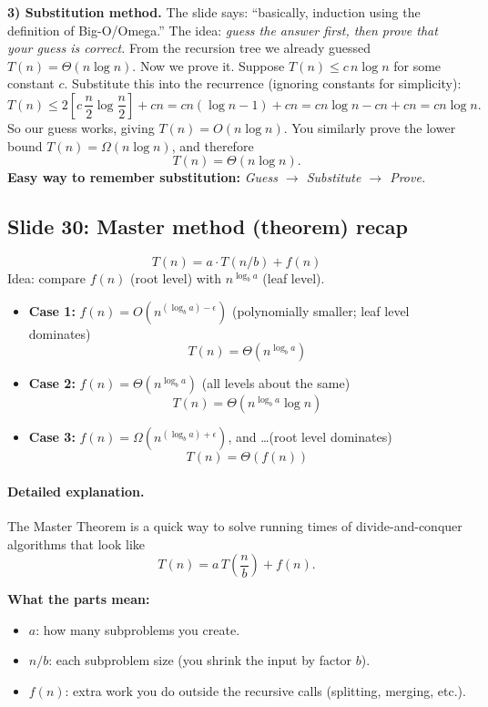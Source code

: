 \documentclass[11pt]{article}
\newcommand{\slide}[2]{\subsection*{Slide #1: #2}}
\begin{document}
\textbf{3) Substitution method.}
The slide says: ``basically, induction using the definition of Big-O/Omega.'' The idea:
\emph{guess the answer first, then prove that your guess is correct.}
From the recursion tree we already guessed $T(n) = \Theta(n \log n)$. Now we prove it.
Suppose $T(n) \le c\, n \log n$ for some constant $c$. Substitute this into the recurrence
(ignoring constants for simplicity):
\[
  T(n) \le 2\left[ c\,\frac{n}{2} \log\frac{n}{2} \right] + cn
        = cn(\log n - 1) + cn
        = cn\log n - cn + cn
        = cn\log n.
\]
So our guess works, giving $T(n) = O(n \log n)$. You similarly prove the lower bound
$T(n) = \Omega(n \log n)$, and therefore
\[
  \boxed{T(n) = \Theta(n \log n)}.
\]
\textbf{Easy way to remember substitution:} \emph{Guess $\to$ Substitute $\to$ Prove.}

\slide{30}{Master method (theorem) recap}
\[
  T(n) = a \cdot T(n/b) + f(n)
\]
Idea: compare $f(n)$ (root level) with $n^{\log_b a}$ (leaf level).
\begin{itemize}
  \item \textbf{Case 1:} $f(n) = O(n^{(\log_b a) - \epsilon})$ \hfill (polynomially smaller; leaf level dominates)
        \[ T(n) = \Theta(n^{\log_b a}) \]
  \item \textbf{Case 2:} $f(n) = \Theta(n^{\log_b a})$ \hfill (all levels about the same)
        \[ T(n) = \Theta(n^{\log_b a} \log n) \]
  \item \textbf{Case 3:} $f(n) = \Omega(n^{(\log_b a) + \epsilon})$, and \ldots \hfill (root level dominates)
        \[ T(n) = \Theta(f(n)) \]
\end{itemize}

\paragraph{Detailed explanation.}
The Master Theorem is a quick way to solve running times of divide-and-conquer algorithms that
look like
\[
  T(n) = a\,T\!\left(\frac{n}{b}\right) + f(n).
\]

\textbf{What the parts mean:}
\begin{itemize}
  \item $a$: how many subproblems you create.
  \item $n/b$: each subproblem size (you shrink the input by factor $b$).
  \item $f(n)$: extra work you do outside the recursive calls (splitting, merging, etc.).
\end{itemize}
\end{document}
